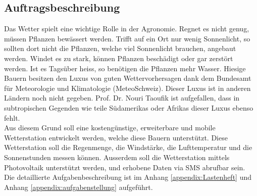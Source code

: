 \subsection{Auftragsbeschreibung}
\label{subsec:Auftrag}
Das Wetter spielt eine wichtige Rolle in der Agronomie. Regnet es nicht genug, müssen Pflanzen bewässert werden. Trifft auf ein Ort nur wenig Sonnenlicht, so sollten dort nicht die Pflanzen, welche viel Sonnenlicht brauchen, angebaut werden. Windet es zu stark, können Pflanzen beschädigt oder gar zerstört werden. Ist es Tagsüber heiss, so benötigen die Pflanzen mehr Wasser. Hiesige Bauern besitzen den Luxus von guten Wettervorhersagen dank dem Bundesamt für Meteorologie und Klimatologie (MeteoSchweiz). Dieser Luxus ist in anderen Ländern noch nicht gegeben. Prof. Dr. Nouri Taoufik ist aufgefallen, dass in subtropischen Gegenden wie teile Südamerikas oder Afrikas dieser Luxus ebenso fehlt. \\

Aus diesem Grund soll eine kostengünstige, erweiterbare und mobile Wetterstation entwickelt werden, welche diese Bauern unterstützt. Diese Wetterstation soll die Regenmenge, die Windstärke, die Lufttemperatur und die Sonnenstunden messen können. Ausserdem soll die Wetterstation mittels Photovoltaik unterstützt werden, und erhobene Daten via SMS abrufbar sein. \\

Die detaillierte Aufgabenbeschreibung ist im Anhang \ref{appendix:Lastenheft}  und Anhang \ref{appendix:aufgabenstellung}  aufgeführt.\\
